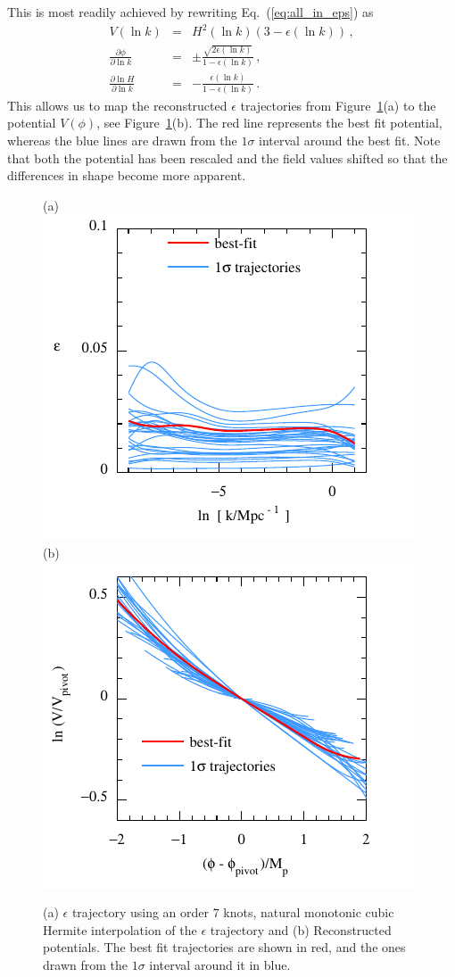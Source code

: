 \documentclass[a4paper,11pt]{article}
\begin{document}
This is most readily achieved by rewriting Eq.~(\ref{eq:all_in_eps})
as
\begin{eqnarray}
  V(\ln k)&=&H^2(\ln k)\left(3-\epsilon(\ln k)\right)\,,\\
  \frac{\partial \phi}{\partial \ln k}&=&\pm\frac{\sqrt{2\epsilon(\ln k)}}{1-\epsilon(\ln k)}\,,\\
  \frac{\partial \ln H}{\partial \ln k}&=& - \frac{\epsilon(\ln k)}{1-\epsilon(\ln k)}\,.
\end{eqnarray}
This allows us to map the reconstructed $\epsilon$ trajectories from
Figure~\ref{fig:p7eps_potentials}(a) to the potential $V(\phi)$, see
Figure~\ref{fig:p7eps_potentials}(b). The red line represents the best
fit potential, whereas the blue lines are drawn from the $1\sigma$
interval around the best fit. Note that both the potential has been
rescaled and the field values shifted so that the differences in shape
become more apparent.
\begin{figure}
  (a)\includegraphics[width=0.45\linewidth]{p7eps_traj2}
  (b)\includegraphics[width=0.45\linewidth]{p7eps_traj1}
  \caption{(a) $\epsilon$ trajectory using an order $7$ knots, natural
    monotonic cubic Hermite interpolation of the $\epsilon$ trajectory
    and (b) Reconstructed potentials. The best fit trajectories are
    shown in red, and the ones drawn from the $1\sigma$ interval
    around it in blue.}
  \label{fig:p7eps_potentials}
\end{figure}
\end{document}
